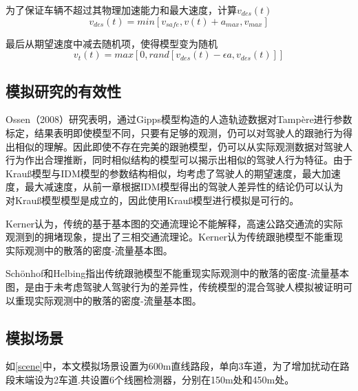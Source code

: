 为了保证车辆不超过其物理加速能力和最大速度，计算$v_{des}(t)$
\begin{equation}
v_{des}(t)=min[v_{safe},v(t)+a_{max},v_{max}]
\end{equation}

最后从期望速度中减去随机项，使得模型变为随机
\begin{equation}
v_{t}(t)=max[0,rand[v_{des}(t)-\epsilon a,v_{des}(t)]]
\end{equation}



\subsection{模拟研究的有效性}

Ossen（2008）\cite{Ossen2008}研究表明，通过Gipps模型构造的人造轨迹数据对Tampère进行参数标定，结果表明即使模型不同，只要有足够的观测，仍可以对驾驶人的跟驰行为得出相似的理解。因此即使不存在完美的跟驰模型，仍可以从实际观测数据对驾驶人行为作出合理推断，同时相似结构的模型可以揭示出相似的驾驶人行为特征。由于Krauß模型与IDM模型的参数结构相似，均考虑了驾驶人的期望速度，最大加速度，最大减速度，从前一章根据IDM模型得出的驾驶人差异性的结论仍可以认为对Krauß模型模型是成立的，因此使用Krauß模型进行模拟是可行的。




Kerner\cite{S.Kerner2009}认为，传统的基于基本图的交通流理论不能解释，高速公路交通流的实际观测到的拥堵现象，提出了三相交通流理论。Kerner认为传统跟驰模型不能重现实际观测中的散落的密度-流量基本图。


Schönhof和Helbing\cite{Schoenhof2009}指出传统跟驰模型不能重现实际观测中的散落的密度-流量基本图，是由于未考虑驾驶人驾驶行为的差异性，传统模型的混合驾驶人模拟被证明可以重现实际观测中的散落的密度-流量基本图。



\subsection{模拟场景}


如\autoref{scene}中，本文模拟场景设置为600m直线路段，单向3车道，为了增加扰动在路段末端设为2车道.共设置6个线圈检测器，分别在150m处和450m处。

